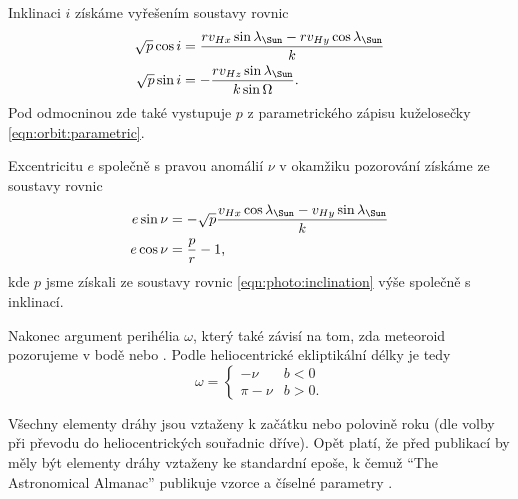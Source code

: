Inklinaci $i$ získáme vyřešením soustavy rovnic \cite{ceplecha}
\begin{equation}
    \begin{aligned}
        \sqrt{p}\cos{i}&=\frac{rv_{Hx}\sin{\lambda_\text{\Sun}}-rv_{Hy}\cos{\lambda_\text{\Sun}}}{k}\\
        \sqrt{p}\sin{i}&=-\frac{rv_{Hz}\sin{\lambda_\text{\Sun}}}{k\sin{\Omega}}\text{.}
    \end{aligned}
    \label{eqn:photo:inclination}
\end{equation}
Pod odmocninou zde také vystupuje $p$ z parametrického zápisu kuželosečky \eqref{eqn:orbit:parametric}.

Excentricitu $e$ společně s pravou anomálií $\nu$ v okamžiku pozorování získáme ze soustavy rovnic \cite{ceplecha}
\begin{equation}
    \begin{aligned}
        e\sin{\nu}&=-\sqrt{p}\frac{v_{Hx}\cos{\lambda_\text{\Sun}}-v_{Hy}\sin{\lambda_\text{\Sun}}}{k}\\
        e\cos{\nu}&=\frac{p}{r}-1\text{,}
    \end{aligned}
\end{equation}
kde $p$ jsme získali ze soustavy rovnic \eqref{eqn:photo:inclination} výše společně s inklinací.

Nakonec argument perihélia $\omega$, který také závisí na tom, zda meteoroid pozorujeme v bodě {\NorthNode} nebo {\SouthNode}. Podle heliocentrické ekliptikální délky je tedy \cite{ceplecha}
\begin{equation}
    \omega=\begin{cases}
        -\nu&b<0\\
        \pi-\nu&b>0 \text{.}
    \end{cases}
\end{equation}

\smallskip

Všechny elementy dráhy jsou vztaženy k začátku nebo polovině roku (dle volby při převodu do heliocentrických souřadnic dříve). Opět platí, že před publikací by měly být elementy dráhy vztaženy ke standardní epoše, k čemuž "`The Astronomical Almanac"' publikuje vzorce a číselné parametry \cite{ceplecha}.
